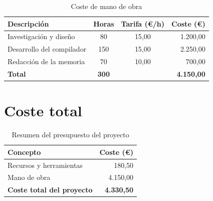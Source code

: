\begin{table}[!ht]
\centering
\caption{Coste de mano de obra}
\label{tbl:mano-de-obra}
\begin{tabularx}{0.85\textwidth}{Xccr}
    \toprule
    \textbf{Descripción} & \textbf{Horas} & \textbf{Tarifa (€/h)} & \textbf{Coste (€)} \\
    \midrule
    Investigación y diseño & 80 & 15,00 & 1.200,00 \\
    Desarrollo del compilador & 150 & 15,00 & 2.250,00 \\
    Redacción de la memoria & 70 & 10,00 & 700,00 \\
    \midrule
    \textbf{Total} & \textbf{300} & & \textbf{4.150,00} \\
    \bottomrule
\end{tabularx}
\end{table}

\section{Coste total}

\begin{table}[!ht]
\centering
\caption{Resumen del presupuesto del proyecto}
\label{tbl:presupuesto}
\begin{tabularx}{0.85\textwidth}{Xr}
    \toprule
    \textbf{Concepto} & \textbf{Coste (€)} \\
    \midrule
    Recursos y herramientas & 180,50 \\
    Mano de obra & 4.150,00 \\
    \midrule
    \textbf{Coste total del proyecto} & \textbf{4.330,50} \\
    \bottomrule
\end{tabularx}
\end{table}
